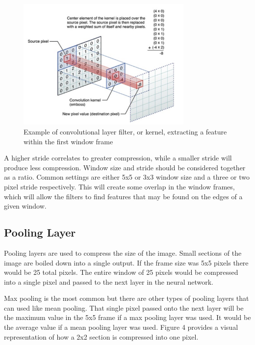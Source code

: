\documentclass[5p,authoryear]{elsarticle}
\begin{document}
\begin{figure}[!h] 
    \centering
	\includegraphics[width=3.4in]{figures/Conv-Layer.png}
	\caption[]{Example of convolutional layer filter, or kernel, extracting a feature within the first window frame} 
	\label{ConvNet} 
\end{figure}



A higher stride correlates to greater compression, while a smaller stride will produce less compression. Window size and stride should be considered together as a ratio. Common settings are either 5x5 or 3x3 window size and a three or two pixel stride respectively. This will create some overlap in the window frames, which will allow the filters to find features that may be found on the edges of a given window.

\subsection{Pooling Layer}

Pooling layers are used to compress the size of the image. Small sections of the image are boiled down into a single output. If the frame size was 5x5 pixels there would be 25 total pixels. The entire window of 25 pixels would be compressed into a single pixel and passed to the next layer in the neural network.  

Max pooling is the most common but there are other types of pooling layers that can used like mean pooling. That single pixel passed onto the next layer will be the maximum value in the 5x5 frame if a max pooling layer was used. It would be the average value if a mean pooling layer was used. Figure 4 provides a visual representation of how a 2x2 section is compressed into one pixel.  
\end{document}

